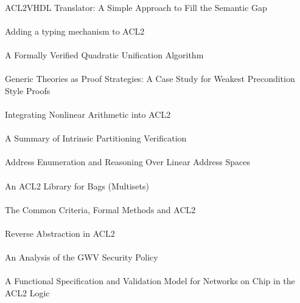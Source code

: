 \documentclass{article}
\begin{document}
\cite{04-sawada-vhdl} \\
ACL2VHDL Translator: A Simple Approach to Fill the Semantic Gap \\

\cite{04-austel-typing} \\
Adding a typing mechanism to ACL2 \\

\cite{04-reina-unification} \\
A Formally Verified Quadratic Unification Algorithm \\

\cite{04-legato-preconditions} \\
Generic Theories as Proof Strategies: A Case Study for Weakest Precondition Style Proofs \\

\cite{04-hunt-nonlinear} \\
Integrating Nonlinear Arithmetic into ACL2 \\

\cite{04-greve-partitioning} \\
A Summary of Intrinsic Partitioning Verification \\

\cite{04-greve-enumeration} \\
Address Enumeration and Reasoning Over Linear Address Spaces \\

\cite{04-smith-bags} \\
An ACL2 Library for Bags (Multisets) \\

\cite{04-richards-common} \\
The Common Criteria, Formal Methods and ACL2 \\

\cite{04-young-abstract} \\
Reverse Abstraction in ACL2 \\

\cite{04-foss-gwv} \\
An Analysis of the GWV Security Policy \\

\cite{04-schmaltz-network} \\
A Functional Specification and Validation Model for Networks on Chip in the ACL2 Logic \\
\end{document}
